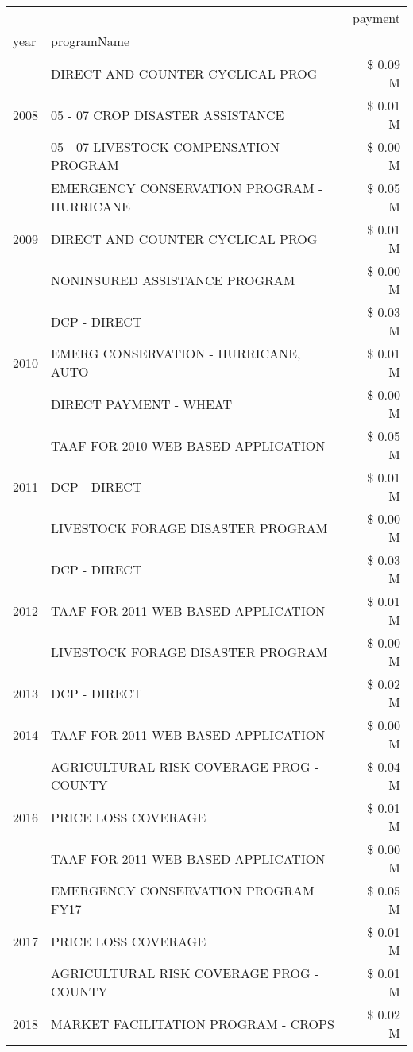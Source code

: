 \begin{tabular}{llr}
\toprule
 &  & payment \\
year & programName &  \\
\midrule
\multirow[t]{3}{*}{2008} & DIRECT AND COUNTER CYCLICAL PROG & \$ 0.09 M \\
 & 05 - 07 CROP DISASTER ASSISTANCE & \$ 0.01 M \\
 & 05 - 07 LIVESTOCK COMPENSATION PROGRAM & \$ 0.00 M \\
\cline{1-3}
\multirow[t]{3}{*}{2009} & EMERGENCY CONSERVATION PROGRAM - HURRICANE & \$ 0.05 M \\
 & DIRECT AND COUNTER CYCLICAL PROG & \$ 0.01 M \\
 & NONINSURED ASSISTANCE PROGRAM & \$ 0.00 M \\
\cline{1-3}
\multirow[t]{3}{*}{2010} & DCP - DIRECT & \$ 0.03 M \\
 & EMERG CONSERVATION - HURRICANE, AUTO & \$ 0.01 M \\
 & DIRECT PAYMENT - WHEAT & \$ 0.00 M \\
\cline{1-3}
\multirow[t]{3}{*}{2011} & TAAF FOR 2010 WEB BASED APPLICATION & \$ 0.05 M \\
 & DCP - DIRECT & \$ 0.01 M \\
 & LIVESTOCK FORAGE DISASTER PROGRAM & \$ 0.00 M \\
\cline{1-3}
\multirow[t]{3}{*}{2012} & DCP - DIRECT & \$ 0.03 M \\
 & TAAF FOR 2011 WEB-BASED APPLICATION & \$ 0.01 M \\
 & LIVESTOCK FORAGE DISASTER PROGRAM & \$ 0.00 M \\
\cline{1-3}
2013 & DCP - DIRECT & \$ 0.02 M \\
\cline{1-3}
2014 & TAAF FOR 2011 WEB-BASED APPLICATION & \$ 0.00 M \\
\cline{1-3}
\multirow[t]{3}{*}{2016} & AGRICULTURAL RISK COVERAGE PROG - COUNTY & \$ 0.04 M \\
 & PRICE LOSS COVERAGE & \$ 0.01 M \\
 & TAAF FOR 2011 WEB-BASED APPLICATION & \$ 0.00 M \\
\cline{1-3}
\multirow[t]{3}{*}{2017} & EMERGENCY CONSERVATION PROGRAM FY17 & \$ 0.05 M \\
 & PRICE LOSS COVERAGE & \$ 0.01 M \\
 & AGRICULTURAL RISK COVERAGE PROG - COUNTY & \$ 0.01 M \\
\cline{1-3}
\multirow[t]{3}{*}{2018} & MARKET FACILITATION PROGRAM - CROPS & \$ 0.02 M \\

\end{tabular}
